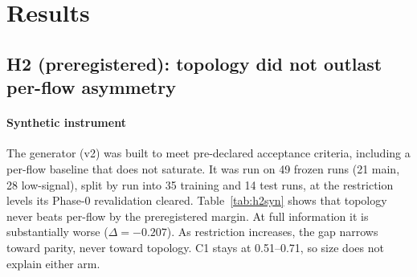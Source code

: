 \documentclass[preprint,12pt]{elsarticle}
\begin{document}
\section{Results}\label{sec:results}

\subsection{H2 (preregistered): topology did not outlast per-flow asymmetry}\label{sec:h2}

\paragraph{Synthetic instrument} The generator (v2) was built to meet pre-declared acceptance criteria, including a per-flow baseline that does not saturate. It was run on 49 frozen runs (21 main, 28 low-signal), split by run into 35 training and 14 test runs, at the restriction levels its Phase-0 revalidation cleared. Table~\ref{tab:h2syn} shows that topology never beats per-flow by the preregistered margin. At full information it is substantially worse ($\Delta = -0.207$). As restriction increases, the gap narrows toward parity, never toward topology. C1 stays at 0.51--0.71, so size does not explain either arm.

\begin{table}[H]
\caption{H2 on the synthetic instrument. $\Delta$ = topology $-$ per-flow AUC; paired bootstrap 95\% CI, $B=2000$. 1:1 sampling and 60\,s truncation are the same unrestricted data.\label{tab:h2syn}}
\centering
{}
\end{table}
\end{document}
